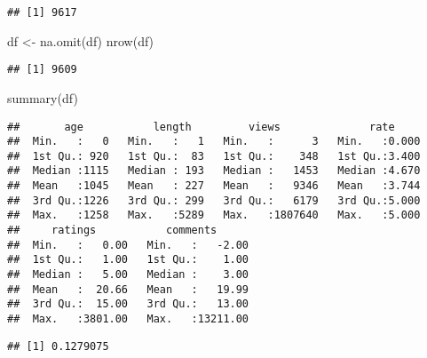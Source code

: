 \documentclass[
]{article}
\newenvironment{Shaded}{\begin{snugshade}}{\end{snugshade}}
\newcommand{\FunctionTok}[1]{\textcolor[rgb]{0.00,0.00,0.00}{#1}}
\newcommand{\NormalTok}[1]{#1}
\newcommand{\OtherTok}[1]{\textcolor[rgb]{0.56,0.35,0.01}{#1}}
\newcommand{\SpecialCharTok}[1]{\textcolor[rgb]{0.00,0.00,0.00}{#1}}
\newcommand{\StringTok}[1]{\textcolor[rgb]{0.31,0.60,0.02}{#1}}
\begin{document}
\begin{verbatim}
## [1] 9617
\end{verbatim}

\begin{Shaded}
\begin{Highlighting}[]
\NormalTok{df }\OtherTok{\textless{}{-}} \FunctionTok{na.omit}\NormalTok{(df)}
\FunctionTok{nrow}\NormalTok{(df)}
\end{Highlighting}
\end{Shaded}

\begin{verbatim}
## [1] 9609
\end{verbatim}

\begin{Shaded}
\begin{Highlighting}[]
\FunctionTok{summary}\NormalTok{(df)}
\end{Highlighting}
\end{Shaded}

\begin{verbatim}
##       age           length         views              rate      
##  Min.   :   0   Min.   :   1   Min.   :      3   Min.   :0.000  
##  1st Qu.: 920   1st Qu.:  83   1st Qu.:    348   1st Qu.:3.400  
##  Median :1115   Median : 193   Median :   1453   Median :4.670  
##  Mean   :1045   Mean   : 227   Mean   :   9346   Mean   :3.744  
##  3rd Qu.:1226   3rd Qu.: 299   3rd Qu.:   6179   3rd Qu.:5.000  
##  Max.   :1258   Max.   :5289   Max.   :1807640   Max.   :5.000  
##     ratings           comments       
##  Min.   :   0.00   Min.   :   -2.00  
##  1st Qu.:   1.00   1st Qu.:    1.00  
##  Median :   5.00   Median :    3.00  
##  Mean   :  20.66   Mean   :   19.99  
##  3rd Qu.:  15.00   3rd Qu.:   13.00  
##  Max.   :3801.00   Max.   :13211.00
\end{verbatim}

\begin{Shaded}
\end{Shaded}

\begin{verbatim}
## [1] 0.1279075
\end{verbatim}

\begin{Shaded}
\end{Shaded}
\end{document}
